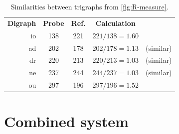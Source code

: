 \begin{table}[h]
\centering
\begin{tabular}{rcccl}
 \bf Digraph & \bf Probe & \bf Ref. & \bf Calculation &  \\
 io & 138 & 221 & $221/138=1.60$ &  \\
 ad & 202 & 178 & $202/178=1.13$ & (similar) \\
 dr & 220 & 213 & $220/213=1.03$ & (similar) \\
 ne & 237 & 244 & $244/237=1.03$ & (similar) \\
 ou & 297 & 196 & $297/196=1.52$ & \\
\end{tabular}
\caption{Similarities between trigraphs from \cref{fig:R-measure}.}
\label{tab:A-distance-similar}
\end{table}





\section{Combined system}



%




%
%
%
